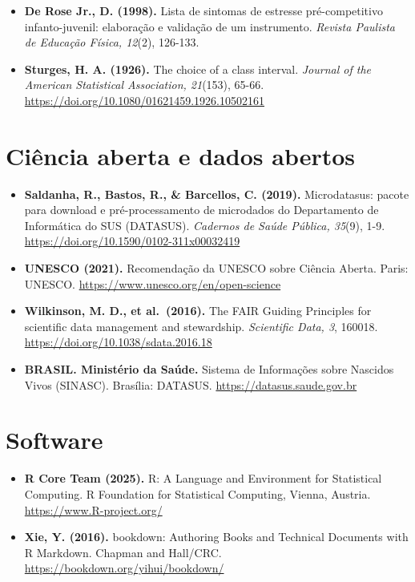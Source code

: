 \documentclass[
]{book}
\begin{document}
\begin{itemize}
\item
  \textbf{De Rose Jr., D. (1998).} Lista de sintomas de estresse pré-competitivo infanto-juvenil: elaboração e validação de um instrumento. \emph{Revista Paulista de Educação Física, 12}(2), 126-133.
\item
  \textbf{Sturges, H. A. (1926).} The choice of a class interval. \emph{Journal of the American Statistical Association, 21}(153), 65-66. \url{https://doi.org/10.1080/01621459.1926.10502161}
\end{itemize}

\section*{Ciência aberta e dados abertos}\label{ciuxeancia-aberta-e-dados-abertos}

\begin{itemize}
\item
  \textbf{Saldanha, R., Bastos, R., \& Barcellos, C. (2019).} Microdatasus: pacote para download e pré-processamento de microdados do Departamento de Informática do SUS (DATASUS). \emph{Cadernos de Saúde Pública, 35}(9), 1-9. \url{https://doi.org/10.1590/0102-311x00032419}
\item
  \textbf{UNESCO (2021).} Recomendação da UNESCO sobre Ciência Aberta. Paris: UNESCO. \url{https://www.unesco.org/en/open-science}
\item
  \textbf{Wilkinson, M. D., et al.~(2016).} The FAIR Guiding Principles for scientific data management and stewardship. \emph{Scientific Data, 3}, 160018. \url{https://doi.org/10.1038/sdata.2016.18}
\item
  \textbf{BRASIL. Ministério da Saúde.} Sistema de Informações sobre Nascidos Vivos (SINASC). Brasília: DATASUS. \url{https://datasus.saude.gov.br}
\end{itemize}

\section*{Software}\label{software}

\begin{itemize}
\item
  \textbf{R Core Team (2025).} R: A Language and Environment for Statistical Computing. R Foundation for Statistical Computing, Vienna, Austria. \url{https://www.R-project.org/}
\item
  \textbf{Xie, Y. (2016).} bookdown: Authoring Books and Technical Documents with R Markdown. Chapman and Hall/CRC. \url{https://bookdown.org/yihui/bookdown/}
\end{itemize}


\end{document}
